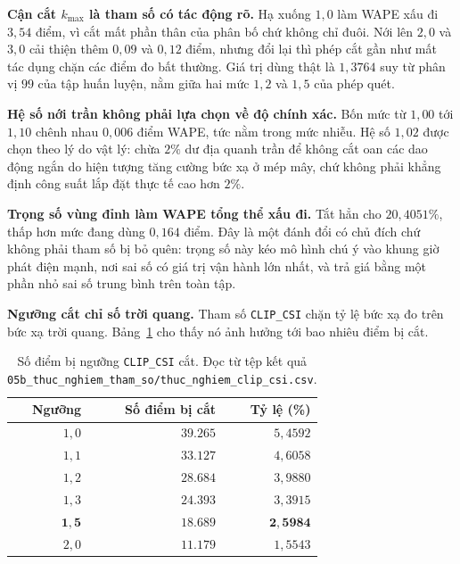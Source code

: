 \documentclass[12pt, a4paper]{report}
\begin{document}
\textbf{Cận cắt $k_{\max}$ là tham số có tác động rõ.} Hạ xuống $1{,}0$ làm WAPE xấu đi
$3{,}54$ điểm, vì cắt mất phần thân của phân bố chứ không chỉ đuôi. Nới lên $2{,}0$ và $3{,}0$
cải thiện thêm $0{,}09$ và $0{,}12$ điểm, nhưng đổi lại thì phép cắt gần như mất tác dụng chặn
các điểm đo bất thường. Giá trị dùng thật là $1{,}3764$ suy từ phân vị $99$ của tập huấn
luyện, nằm giữa hai mức $1{,}2$ và $1{,}5$ của phép quét.

\textbf{Hệ số nới trần không phải lựa chọn về độ chính xác.} Bốn mức từ $1{,}00$ tới $1{,}10$
chênh nhau $0{,}006$ điểm WAPE, tức nằm trong mức nhiễu. Hệ số $1{,}02$ được chọn theo lý do
vật lý: chừa $2\%$ dư địa quanh trần để không cắt oan các dao động ngắn do hiện tượng tăng
cường bức xạ ở mép mây, chứ không phải khẳng định công suất lắp đặt thực tế cao hơn $2\%$.

\textbf{Trọng số vùng đỉnh làm WAPE tổng thể xấu đi.} Tắt hẳn cho $20{,}4051\%$, thấp hơn mức
đang dùng $0{,}164$ điểm. Đây là một đánh đổi có chủ đích chứ không phải tham số bị bỏ quên:
trọng số này kéo mô hình chú ý vào khung giờ phát điện mạnh, nơi sai số có giá trị vận hành
lớn nhất, và trả giá bằng một phần nhỏ sai số trung bình trên toàn tập.

\textbf{Ngưỡng cắt chỉ số trời quang.} Tham số \texttt{CLIP\_CSI} chặn tỷ lệ bức xạ đo trên bức xạ
trời quang. Bảng~\ref{tab:clip_csi} cho thấy nó ảnh hưởng tới bao nhiêu điểm bị cắt.

\begin{table}[htbp]
\centering
\caption{Số điểm bị ngưỡng \texttt{CLIP\_CSI} cắt. Đọc từ tệp kết quả
\texttt{05b\_thuc\_nghiem\_tham\_so/thuc\_nghiem\_clip\_csi.csv}.}
\label{tab:clip_csi}
\small
\begin{tabular}{r r r}
\toprule
\textbf{Ngưỡng} & \textbf{Số điểm bị cắt} & \textbf{Tỷ lệ (\%)} \\
\midrule
$1{,}0$ & $39.265$ & $5{,}4592$ \\
$1{,}1$ & $33.127$ & $4{,}6058$ \\
$1{,}2$ & $28.684$ & $3{,}9880$ \\
$1{,}3$ & $24.393$ & $3{,}3915$ \\
$\mathbf{1{,}5}$ & $\mathbf{18.689}$ & $\mathbf{2{,}5984}$ \\
$2{,}0$ & $11.179$ & $1{,}5543$ \\
\bottomrule
\end{tabular}
\caption[Số điểm bị ngưỡng \texttt{CLIP\_CSI} cắt]{Số điểm bị ngưỡng \texttt{CLIP\_CSI} cắt. Đọc từ tệp kết quả
\texttt{05b\_thuc\_nghiem\_tham\_so/thuc\_nghiem\_clip\_csi.csv}.}
\label{tab:clip_csi}
\end{table}
\end{document}

